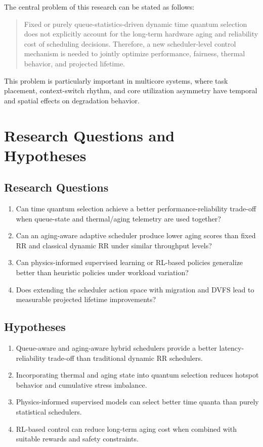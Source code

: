 \documentclass[12pt,a4paper]{article}
\begin{document}
The central problem of this research can be stated as follows:

\begin{quote}
Fixed or purely queue-statistics-driven dynamic time quantum selection does not explicitly account for the
long-term hardware aging and reliability cost of scheduling decisions. Therefore, a new scheduler-level control
mechanism is needed to jointly optimize performance, fairness, thermal behavior, and projected lifetime.
\end{quote}

This problem is particularly important in multicore systems, where task placement, context-switch rhythm, and
core utilization asymmetry have temporal and spatial effects on degradation behavior.

\section{Research Questions and Hypotheses}

\subsection{Research Questions}

\begin{enumerate}[leftmargin=*]
\item Can time quantum selection achieve a better performance-reliability trade-off when queue-state and thermal/aging telemetry are used together?
\item Can an aging-aware adaptive scheduler produce lower aging scores than fixed RR and classical dynamic RR under similar throughput levels?
\item Can physics-informed supervised learning or RL-based policies generalize better than heuristic policies under workload variation?
\item Does extending the scheduler action space with migration and DVFS lead to measurable projected lifetime improvements?
\end{enumerate}

\subsection{Hypotheses}

\begin{enumerate}[leftmargin=*]
\item Queue-aware and aging-aware hybrid schedulers provide a better latency-reliability trade-off than traditional dynamic RR schedulers.
\item Incorporating thermal and aging state into quantum selection reduces hotspot behavior and cumulative stress imbalance.
\item Physics-informed supervised models can select better time quanta than purely statistical schedulers.
\item RL-based control can reduce long-term aging cost when combined with suitable rewards and safety constraints.
\end{enumerate}
\end{document}
